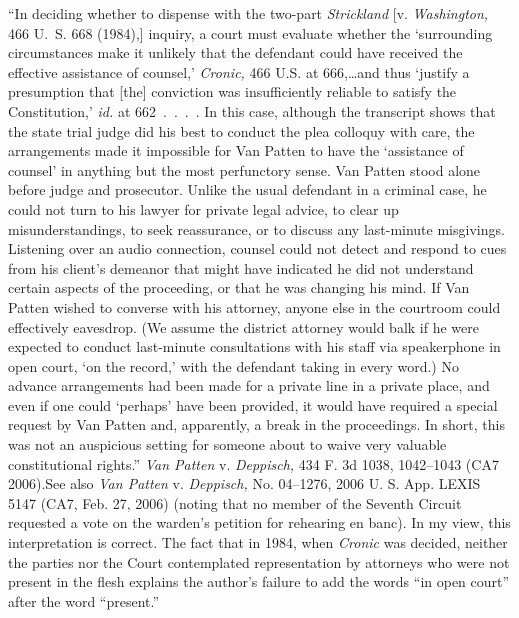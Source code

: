 {``In deciding whether to dispense with the two-part \emph{Strickland} [v. \emph{Washington,} 466 U.~S. 668 (1984),] inquiry, a court must evaluate whether the ‘surrounding circumstances make it unlikely that the defendant could have received the effective assistance of counsel,' \emph{Cronic,} 466 U.S. at 666,\dots and thus ‘justify a presumption that [the] conviction was insufficiently reliable to satisfy the Constitution,' \emph{id.} at 662~.~.~.~. In this case, although the transcript shows that the state trial judge did his best to conduct the plea colloquy with care, the arrangements made it impossible for Van Pat\newpage ten to have the ‘assistance of counsel' in anything but the most perfunctory sense. Van Patten stood alone before judge and prosecutor. Unlike the usual defendant in a criminal case, he could not turn to his lawyer for private legal advice, to clear up misunderstandings, to seek reassurance, or to discuss any last-minute misgivings. Listening over an audio connection, counsel could not detect and respond to cues from his client's demeanor that might have indicated he did not understand certain aspects of the proceeding, or that he was changing his mind. If Van Patten wished to converse with his attorney, anyone else in the courtroom could effectively eavesdrop. (We assume the district attorney would balk if he were expected to conduct last-minute consultations with his staff via speakerphone in open court, ‘on the record,' with the defendant taking in every word.) No advance arrangements had been made for a private line in a private place, and even if one could ‘perhaps' have been provided, it would have required a special request by Van Patten and, apparently, a break in the proceedings. In short, this was not an auspicious setting for someone about to waive very valuable constitutional rights.'' \emph{Van Patten} v. \emph{Deppisch,} 434 F. 3d 1038, 1042--1043 (CA7 2006).\newpage See also \emph{Van Patten} v. \emph{Deppisch,} No. 04--1276, 2006 U. S. App. LEXIS 5147 (CA7, Feb. 27, 2006) (noting that no member of the Seventh Circuit requested a vote on the warden's petition for rehearing en banc). In my view, this interpretation is correct. The fact that in 1984, when \emph{Cronic} was decided, neither the parties nor the Court contemplated representation by attorneys who were not present in the flesh explains the author's failure to add the words ``in open court'' after the word ``present.''}

